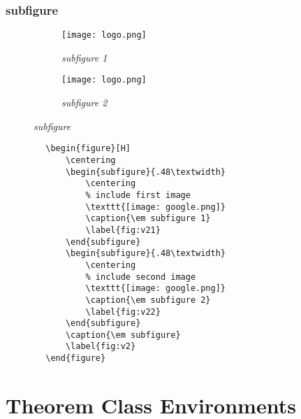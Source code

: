 \documentclass[a4paper, 12pt]{article}
\begin{document}
\subsubsection{subfigure}
\begin{figure}[H]
    \centering
    \begin{subfigure}{.48\textwidth}
        \centering
        \texttt{[image: logo.png]}
        \caption{\em subfigure 1}
        \label{fig:v21}
    \end{subfigure}
    \begin{subfigure}{.48\textwidth}
        \centering
        \texttt{[image: logo.png]}
        \caption{\em subfigure 2}
        \label{fig:v22}
    \end{subfigure}
    \caption{\em subfigure}
    \label{fig:v2}
\end{figure}

\begin{listing}[ht]
    \begin{verbatim}
        \begin{figure}[H]
            \centering
            \begin{subfigure}{.48\textwidth}
                \centering
                % include first image
                \texttt{[image: google.png]}
                \caption{\em subfigure 1}
                \label{fig:v21}
            \end{subfigure}
            \begin{subfigure}{.48\textwidth}
                \centering
                % include second image
                \texttt{[image: google.png]}
                \caption{\em subfigure 2}
                \label{fig:v22}
            \end{subfigure}
            \caption{\em subfigure}
            \label{fig:v2}
        \end{figure}
    \end{verbatim}
    \caption{\em Subfigure}
    \label{subfigure}
\end{listing}

\clearpage

\section{Theorem Class Environments}
\begin{defn}{}{}
    
\end{defn}
\end{document}
